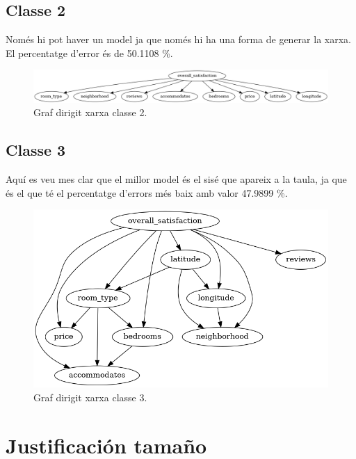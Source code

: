 \documentclass{article}
\begin{document}
\subsection{Classe 2}
Només hi pot haver un model ja que només hi ha una forma de generar la xarxa. El percentatge d'error és de 50.1108 \%.
\begin{figure}[H]
  \includegraphics[width=\linewidth]{classe2.png}
  \caption{Graf dirigit xarxa classe 2.}
  \label{fig:gp2}
\end{figure}
\subsection{Classe 3}
Aquí es veu mes clar que el millor model és el sisé que apareix a la taula, ja que és el que té el percentatge d'errors més baix amb valor 47.9899 \%.
\begin{figure}[H]
  \includegraphics[width=\linewidth]{classe3.png}
  \caption{Graf dirigit xarxa classe 3.}
  \label{fig:gp3}
\end{figure}

\section{Justificación tamaño}
\end{document}
